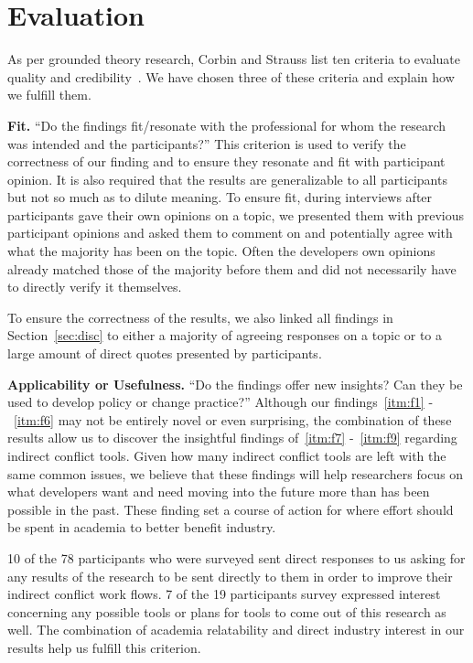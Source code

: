 \documentclass[conference]{IEEEtran}
\begin{document}
\section{Evaluation}
\label{sec:eval}

As per grounded theory research, Corbin and Strauss list ten criteria to evaluate quality and credibility~\cite{Corbin:1998:SP}.
We have chosen three of these criteria and explain how we fulfill them.

{\bfseries Fit.} ``Do the findings fit/resonate with the professional for whom the research was intended and the participants?'' This
criterion is used to verify the correctness of our finding and to ensure they resonate and fit with participant opinion. It is also
required that the results are generalizable to all participants but not so much as to dilute meaning. To ensure fit, during interviews
after participants gave their own opinions on a topic, we presented them with previous participant opinions and asked them to comment
on and potentially agree with what the majority has been on the topic. Often the developers own opinions already matched those of
the majority before them and did not necessarily have to directly verify it themselves.

To ensure the correctness of the results, we also linked all findings in Section~\ref{sec:disc} to either a majority of agreeing
responses on a topic or to a large amount of direct quotes presented by participants.

{\bfseries Applicability or Usefulness.} ``Do the findings offer new insights? Can they be used to develop policy or change practice?''
Although our findings~\ref{itm:f1} -~\ref{itm:f6} may not be entirely novel or even surprising, the combination of these results allow us to discover the
insightful findings of~\ref{itm:f7} -~\ref{itm:f9} regarding indirect conflict tools. Given how many indirect conflict tools are left with the same common
issues, we believe that these findings will help researchers focus on what developers want and need moving into the future more than has
been possible in the past. These finding set a course of action for where effort should be spent in academia to better benefit industry.

10 of the 78 participants who were surveyed sent direct responses to us asking for any results of the research to be sent directly to
them in order to improve their indirect conflict work flows. 7 of the 19 participants survey expressed interest concerning any possible
tools or plans for tools to come out of this research as well. The combination of academia relatability and direct industry interest 
in our results help us fulfill this criterion.
\end{document}
